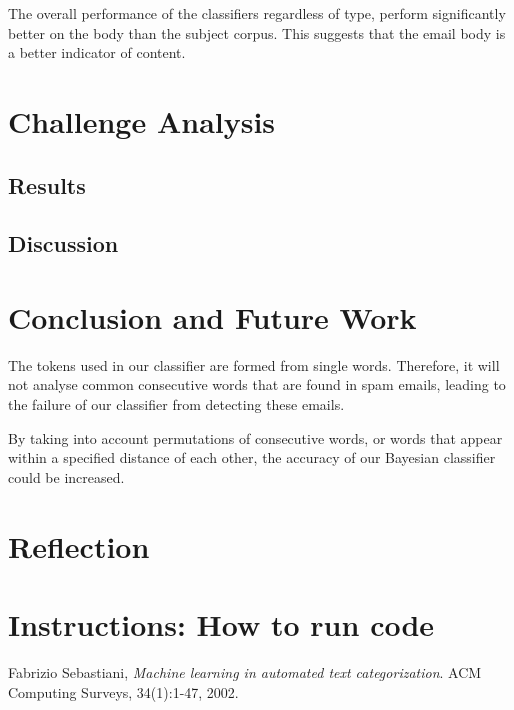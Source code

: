 \documentclass[10pt, a4paper]{article}
\begin{document}
The overall performance of the classifiers regardless of type, perform significantly better on the body than the subject corpus. This suggests that the email body is a better indicator of content.

\section{Challenge Analysis}


\subsection{Results}

\subsection{Discussion}

\section{Conclusion and Future Work}

The tokens used in our classifier are formed from single words. Therefore, it will not analyse common consecutive words that are found in spam emails, leading to the failure of our classifier from detecting these emails.

By taking into account permutations of consecutive words, or words that appear within a specified distance of each other, the accuracy of our Bayesian classifier could be increased.

\section{Reflection}

\section{Instructions: How to run code}

\begin{thebibliography}{9}

  Fabrizio Sebastiani,
  \emph{Machine learning in automated text categorization}.
  ACM Computing Surveys,
  34(1):1-47,
  2002.

\end{thebibliography}
\end{document}
